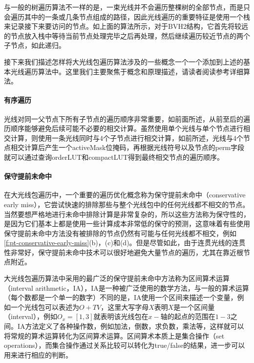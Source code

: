 与一般的树遍历算法不一样的是，一束光线并不会遍历整棵树的全部节点，而是只会遍历其中的一条或几条节点组成的路径，因此光线遍历的重要特征是使用一个栈来记录接下来要访问的节点。如上面的算法所示，对于BVH2结构，它首先将较远的节点放入栈中等待当前节点处理完毕之后再处理，然后继续遍历较近节点的两个子节点，如此递归。

接下来我们描述怎样将大光线包遍历算法涉及的一些概念一个一个添加到上述的基本光线遍历算法中。这里我们主要聚焦于概念和原理描述，请读者阅读\cite{a:EfficientRayTracingKernelsforModernCPUArchitectures}参考详细算法。





\paragraph{有序遍历}
光线对同一父节点下所有子节点的遍历顺序非常重要，如前面所述，从前至后的遍历顺序能够避免后续可能不必要的相交计算。虽然\cite{a:RayTracingDeformableScenesUsingDynamicBoundingVolumeHierarchies}使用单个光线与单个节点进行相交计算，\cite{a:EfficientRayTracingKernelsforModernCPUArchitectures}则使用一条光线同时与4个子节点进行相交计算，如前所述，光线与4个节点相交计算后产生一个activeMask位掩码，再根据光线符号以及节点的perm字段就可以通过查询orderLUT和compactLUT得到最终相交节点的遍历顺序。








\paragraph{保守提前未命中}
在大光线包遍历中，一个重要的遍历优化概念称为保守提前未命中（conservative early miss），它尝试快速的排除那些与整个光线包中的任何光线都不相交的节点。当然要想严格地进行未命中排除计算是非常复杂的，所以这些方法称为保守性的，是因为它们基本上都是使用一些计算成本非常低的保守的预测，这意味着有些使用保守提前未命中方法没有被排除的节点仍然有可能与任何光线都不相交，例如\ref{f:pt-conservative-early-miss}(b)，(c)和(d)。但是尽管如此，由于连贯光线的连贯性非常好，保守提前未命中技术可以很好地避免大量节点的遍历，尤其在靠近根节点附近。

大光线包遍历算法中采用的最广泛的保守提前未命中方法称为区间算术运算（interval arithmetic，IA），IA是一种被广泛使用的数学方法，与一般的算术运算（每个数都是一个单一的数字）不同的是，IA使用一个区间来描述一个变量，例如一个光线包可以表述为$O+TV$，这里大写字母$X$表明$X$是一个区间量（interval），例如$O_x=[1,3]$就表明该光线包在$x-$轴的起点的范围在$1-3$之间。IA方法定义了各种操作数，例如加法，倒数，求负数，乘法等，这样就可以将常规的算术运算转化为区间算术运算。区间算术本质上是集合操作（set operations），而集合操作通过关系比较可以转化为true/false的结果，进一步可以用来进行相应的判断。

